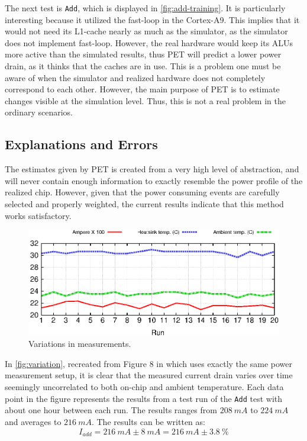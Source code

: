 The next test is \texttt{Add}, which is displayed in \autoref{fig:add-training}.
It is particularly interesting because it utilized the fast-loop in the
Cortex-A9. This implies that it would not need its L1-cache nearly as much as
the simulator, as the simulator does not implement fast-loop. However, the real
hardware would keep its ALUs more active than the simulated results, thus PET
will predict a lower power drain, as it thinks that the caches are in use. This
is a problem one must be aware of when the simulator and realized hardware does
not completely correspond to each other. However, the main purpose of PET is to
estimate changes visible at the simulation level. Thus, this is not a real
problem in the ordinary scenarios.


\subsection{Explanations and Errors}

The estimates given by PET is created from a very high level of abstraction, and
will never contain enough information to exactly resemble the power profile of the
realized chip. However, given that the power consuming events are carefully
selected and properly weighted, the current results indicate that this method
works satisfactory.

\begin{figure}[ht]
    \includegraphics{figs/heat}
    \caption{Variations in measurements.}
    \label{fig:variation}
\end{figure}

In \autoref{fig:variation}, recreated from Figure 8 in
\cite{rundehvatum2013exploring} which uses exactly the same power measurement
setup, it is clear that the measured current drain varies over time seemingly
uncorrelated to both on-chip and ambient temperature. Each data point in the
figure represents the results from a test run of the \texttt{Add} test with
about one hour between each run. The results ranges from $208~mA$ to $224~mA$
and averages to $216~mA$. The results can be written as:
\[
    I_{add} = 216~mA\pm8~mA = 216~mA\pm3.8~\%
\]

